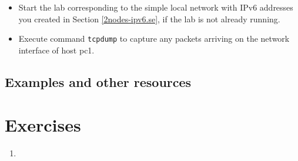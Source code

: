 \documentclass[12pt]{book}
\begin{document}
\begin{itemize}[--]
\item Start the lab corresponding to the simple local network with
  IPv6 addresses you
  created in Section \ref{2nodes-ipv6.se}, if the lab is not already running. 
\item Execute command \verb$tcpdump$ to capture any packets arriving on the
  network interface of host pc1. 
\end{itemize}


\subsection{Examples and other resources}\label{examples.lab1}



\section{Exercises}

\begin{enumerate}[1.]
\item
\end{enumerate}

 
\end{document}
